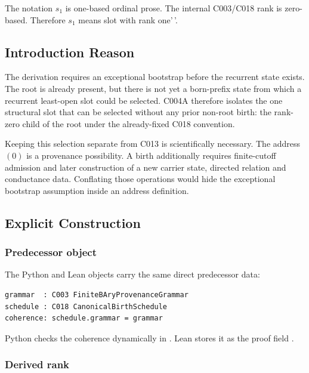 The notation \(s_1\) is one-based ordinal prose. The internal C003/C018
rank is zero-based. Therefore \(s_1\) means
\texttt{\protect{}}slot with
rank one'\,'.

\subsection{Introduction Reason}\label{introduction-reason-7}

The derivation requires an exceptional bootstrap before the recurrent
state exists. The root is already present, but there is not yet a
born-prefix state from which a recurrent least-open slot could be
selected. C004A therefore isolates the one structural slot that can be
selected without any prior non-root birth: the rank-zero child of the
root under the already-fixed C018 convention.

Keeping this selection separate from C013 is scientifically necessary.
The address \((0)\) is a provenance possibility. A birth additionally
requires finite-cutoff admission and later construction of a new carrier
state, directed relation and conductance data. Conflating those
operations would hide the exceptional bootstrap assumption inside an
address definition.

\subsection{Explicit Construction}\label{explicit-construction-2}

\subsubsection{Predecessor object}\label{predecessor-object}

The Python and Lean objects carry the same direct predecessor data:

\begin{verbatim}
grammar  : C003 FiniteBAryProvenanceGrammar
schedule : C018 CanonicalBirthSchedule
coherence: schedule.grammar = grammar
\end{verbatim}

Python checks the coherence dynamically in \texttt{\protect{}}.
Lean stores it as the proof field \texttt{\protect{}}.

\subsubsection{Derived rank}\label{derived-rank}

